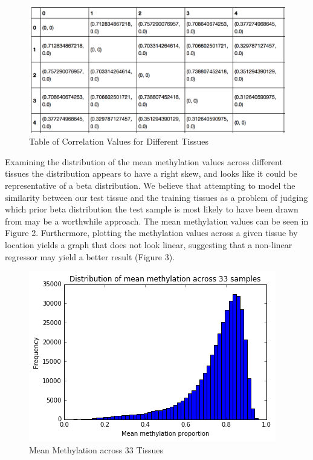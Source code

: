 \documentclass{article} %
\begin{document}
\begin{figure}[!ht]
\begin{center}
\caption{Table of Correlation Values for Different Tissues}
\begin{minipage}[b]{0.40\linewidth}
	\includegraphics[scale=0.3]{table1.png}
\end{minipage}
\end{center}
\end{figure}

Examining the distribution of the mean methylation values across different tissues the distribution appears to have a right skew, and looks like it could be representative of a beta distribution. We believe that attempting to model the similarity between our test tissue and the training tissues as a problem of judging which prior beta distribution the test sample is most likely to have been drawn from may be a worthwhile approach. The mean methylation values can be seen in Figure 2. Furthermore, plotting the methylation values across a given tissue by location yields a graph that does not look linear, suggesting that a non-linear regressor may yield a better result (Figure 3).

\begin{figure}[!ht]
\begin{center}
\caption{Mean Methylation across 33 Tissues}
\begin{minipage}[b]{0.40\linewidth}
	\includegraphics[scale=0.4]{MeanMethylations.png}
\end{minipage}
\end{center}
\end{figure}
\end{document}
